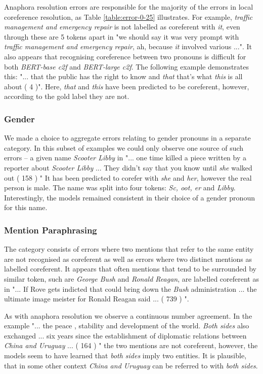\documentclass[11pt]{article}
\begin{document}
Anaphora resolution errors are responsible for the majority of the errors in local coreference resolution, as Table \ref{table:error-0-25} illustrates. For example, \textit{traffic management and emergency repair} is not labelled as coreferent with \textit{it}, even through these are 5 tokens apart in "we should say it was very prompt with \textit{traffic management and emergency repair}, ah, because \textit{it} involved various ...". It also appears that recognising coreference between two pronouns is difficult for both \textit{BERT-base c2f} and \textit{BERT-large c2f}. The following example demonstrates this: "... that the public has the right to know and \textit{that} that's what \textit{this} is all about ( 4 )". Here, \textit{that} and \textit{this} have been predicted to be coreferent, however, according to the gold label they are not.

\subsubsection{Gender}
We made a choice to aggregate errors relating to gender pronouns in a separate category. In this subset of examples we could only observe one source of such errors -- a given name \textit{Scooter Libby} in "... one time killed a piece written by a reporter about \textit{Scooter Libby} ... They didn't say that you know until \textit{she} walked out ( 158 ) " It has been predicted to corefer with \textit{she} and \textit{her}, however the real person is male. The name was split into four tokens: \textit{Sc, oot, er} and \textit{Libby}. Interestingly, the models remained consistent in their choice of a gender pronoun for this name. 


\subsubsection{Mention Paraphrasing} The category consists of errors where two mentions that refer to the same entity are not recognised as coreferent as well as errors where two distinct mentions as labelled coreferent. It appears that often mentions that tend to be surrounded by similar token, such are \textit{George Bush} and \textit{Ronald Reagan}, are labelled coreferent as in "... If Rove gets indicted that could bring down the \textit{Bush} administration ... the ultimate image meister for Ronald Reagan said ... ( 739 ) ". 

As with anaphora resolution we observe a continuous number agreement. In the example "... the peace , stability and development of the world. \textit{Both sides} also exchanged ... six years since the establishment of diplomatic relations between \textit{China and Uruguay} ... ( 164 ) " the two mentions are not coreferent, however, the models seem to have learned that \textit{both sides} imply two entities. It is plausible, that in some other context \textit{China and Uruguay} can be referred to with \textit{both sides}.
\end{document}
